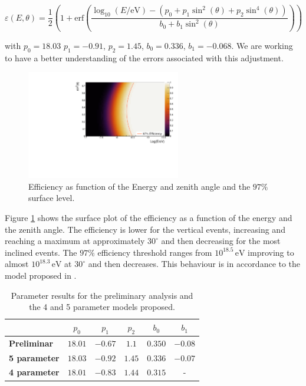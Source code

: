 \documentclass[12pt,a4paper]{article}
\newcommand{\eV}{\, \mathrm{eV}}
\begin{document}
\begin{equation}
\varepsilon(E,\theta)=\frac{1}{2}\left(1+\mathrm{erf}\left(\frac{\log_{10}(E/\mathrm{eV})-(p_0+p_1\sin^2(\theta)+p_2\sin^4(\theta))}{b_0+b_1\sin^2(\theta)}\right)\right)
\label{eqn:fitting}
\end{equation}

with $p_0=18.03$ $p_1=-0.91$, $p_2=1.45$, $b_0=0.336$, $b_1=-0.068$. We are working to have a better understanding of the errors associated with this adjustment.


\begin{figure}[H]
    \begin{center}
        \includegraphics[width=0.6\textwidth]{plots/Surface.pdf}
        \caption{Efficiency as function of the Energy and zenith angle and the $97\%$ surface level.
        \label{fig:surface}}
        \vspace{-0.5cm}
    \end{center}
\end{figure}

Figure \ref{fig:surface} shows the surface plot of the efficiency as a function of the energy and the zenith angle. The efficiency is lower for the vertical events, increasing and reaching a maximum at approximately $30^{\circ}$ and then decreasing for the most inclined events. The $97\%$ efficiency threshold ranges from $10^{18.5}\eV$ improving to almost $10^{18.3}\eV$ at $30^{\circ}$ and then decreases. This behaviour is in accordance to the model proposed in \cite{VerticalSpectrum}.

\begin{table}[H]
\begin{center}
\begin{tabular}{l|ccccc}
        & \textbf{$p_0$} & \textbf{$p_1$} & \textbf{$p_2$} & \textbf{$b_0$} & \textbf{$b_1$} \\ \hline
\textbf{Preliminar}  & $18.01$        & $-0.67$        & $1.1$          & $0.350$        & $-0.08$        \\
\textbf{5 parameter} & $18.03$        & $-0.92$        & $1.45$         & $0.336$        & $-0.07$        \\
\textbf{4 parameter} & $18.01$        & $-0.83$        & $1.44$         & $0.315$        & -             
\end{tabular}
\end{center}
\caption{Parameter results for the preliminary analysis and the 4 and 5 parameter models proposed.}
\label{tab:parameters}
\end{table}
\end{document}
